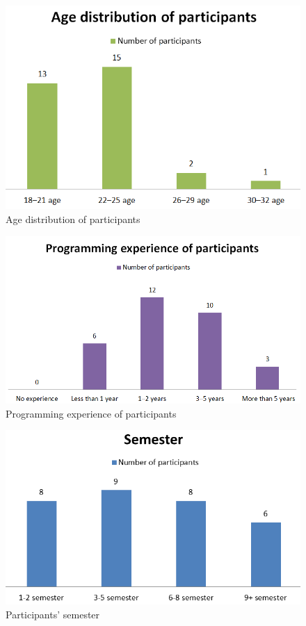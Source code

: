 \begin{figure} [H]
  \centering
  \includegraphics[scale=0.9]{figures/age.png}
  \caption{Age distribution of participants}
  \label{fig:AnhangsChor}
\end{figure}

\begin{figure} [H]
  \centering
  \includegraphics[scale=0.9]{figures/p_exp.png}
  \caption{Programming experience of participants}
  \label{fig:AnhangsChor}
\end{figure}

\begin{figure} [H]
  \centering
  \includegraphics[scale=0.9]{figures/semester.png}
  \caption{Participants' semester}
  \label{fig:AnhangsChor}
\end{figure}


